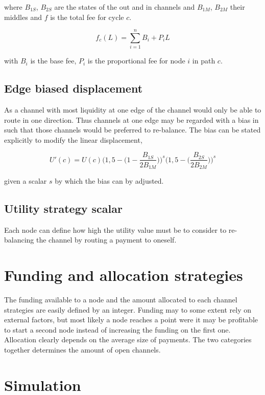 where $B_{1S}$, $B_{2S}$ are the states of the out and in channels and $B_{1M}$, $B_{2M}$ their middles and $f$ is the total fee for cycle $c$. 

\[f_c(L) = \sum_{i=1}^{n} B_i + P_iL \]

with $B_i$ is the base fee, $P_i$ is the proportional fee for \gls{node} $i$ in \gls{path} $c$.

\subsection{Edge biased displacement}
\label{sec:edge:bias:displacement}

As a channel with most liquidity at one edge of the channel would only be able to route in one direction. Thus channels at one edge may be regarded with a bias in such that those channels would be preferred to re-balance. The bias can be stated explicitly to modify the linear displacement,

\[ U'(c) = U(c) \bigg(1,5 - \big(1 - \dfrac{B_{1S}}{2B_{1M}}\big) \bigg)^s \bigg(1,5 - \big(\dfrac{B_{2S}}{2B_{2M}}\big)\bigg)^s  \]

given a scalar $s$ by which the bias can by adjusted.

\subsection{Utility strategy scalar}

Each \gls{node} can define how high the utility value must be to consider to re-balancing the channel by routing a payment to oneself.

\section{Funding and allocation strategies}

The funding available to a node and the amount allocated to each channel strategies are easily defined by an integer. Funding may to some extent rely on external factors, but most likely a node reaches a point were it may be profitable to start a second node instead of increasing the funding on the first one. Allocation clearly depends on the average size of payments. The two categories together determines the amount of open channels. 

\section{Simulation}

